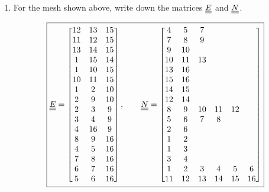 \begin{enumerate}[label=\alph*., start = 1]
    \item For the mesh shown above, write down the matrices $\underline{\underline{E}}$ and $\underline{\underline{N}}$.
    
    \begin{equation*}
        \boxed{\doubleunderline{E} = 
        \begin{bmatrix}
            12 & 13 & 15\\  %
            11 & 12 & 15\\  %
            13 & 14 & 15\\  %
            1 & 15 & 14\\   %
            1 & 10 & 15\\   %
            10 & 11 & 15\\  %
            1 & 2 & 10 \\   %
            2 & 9 & 10\\    %
            2 & 3 & 9\\     %
            3 & 4 & 9\\     %
            4 & 16 & 9\\    %
            8 & 9 & 16\\    %
            4 & 5 & 16\\    %
            7 & 8 & 16\\    %
            6 & 7 & 16\\    %
            5 & 6 & 16
        \end{bmatrix},\qquad 
        \doubleunderline{N} = 
        \begin{bmatrix}
            4 & 5 & 7\\ %
            7 & 8 & 9\\ %
            9 & 10\\    %
            10 & 11 & 13\\ %
            13 & 16\\   %
            15 & 16\\   %
            14 & 15\\   %
            12 & 14\\   %
            8 & 9 & 10 & 11 & 12\\  %
            5 & 6 & 7 & 8\\         %
            2 & 6\\     %
            1 & 2\\     %
            1 & 3\\     %
            3 & 4\\     %
            1 & 2 & 3 & 4 & 5 & 6\\ %
            11 & 12 & 13 & 14 & 15 & 16\\   %
        \end{bmatrix}}
    \end{equation*}
    

\end{enumerate}
